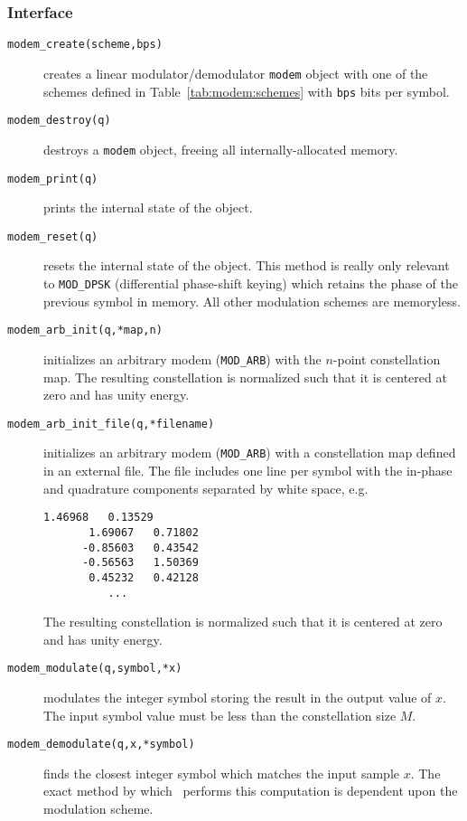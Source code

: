 \subsubsection{Interface}
\label{module:modem:digital:interface}
\begin{description}
\item[{\tt modem\_create(scheme,bps)}]
    creates a linear modulator/demodulator {\tt modem} object with one
    of the schemes defined in Table~\ref{tab:modem:schemes}
    with {\tt bps} bits per symbol.
\item[{\tt modem\_destroy(q)}]
    destroys a {\tt modem} object, freeing all internally-allocated
    memory.
\item[{\tt modem\_print(q)}]
    prints the internal state of the object.
\item[{\tt modem\_reset(q)}]
    resets the internal state of the object.
    This method is really only relevant to {\tt MOD\_DPSK}
    (differential phase-shift keying) which retains the phase of the
    previous symbol in memory.
    All other modulation schemes are memoryless.
\item[{\tt modem\_arb\_init(q,*map,n)}]
    initializes an arbitrary modem ({\tt MOD\_ARB}) with the $n$-point
    constellation map.
    The resulting constellation is normalized such that it is centered
    at zero and has unity energy.
\item[{\tt modem\_arb\_init\_file(q,*filename)}]
    initializes an arbitrary modem ({\tt MOD\_ARB}) with a constellation
    map defined in an external file.
    The file includes one line per symbol with the in-phase and
    quadrature components separated by white space, e.g.
    \begin{Verbatim}[fontsize=\small]
       1.46968   0.13529
       1.69067   0.71802
      -0.85603   0.43542
      -0.56563   1.50369
       0.45232   0.42128
          ...
    \end{Verbatim}
    The resulting constellation is normalized such that it is centered
    at zero and has unity energy.
\item[{\tt modem\_modulate(q,symbol,*x)}]
    modulates the integer symbol storing the result in the output value
    of $x$.
    The input symbol value must be less than the constellation size $M$.
\item[{\tt modem\_demodulate(q,x,*symbol)}]
    finds the closest integer symbol which matches the input sample $x$.
    The exact method by which \liquid\ performs this computation is
    dependent upon the modulation scheme.

\end{description}
